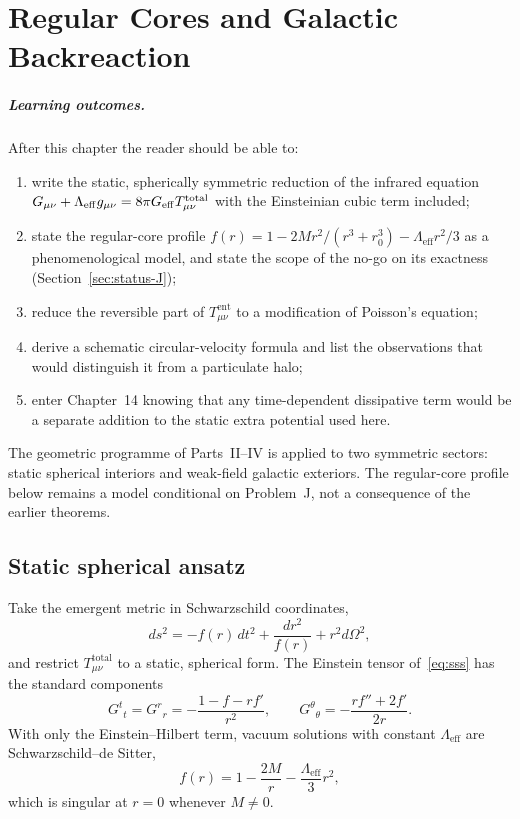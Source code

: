 \chapter[Cores and galaxies]{Regular Cores and Galactic Backreaction}
\label{ch:cores-galaxies}

\paragraph{Learning outcomes.}
After this chapter the reader should be able to:
\begin{enumerate}
  \item write the static, spherically symmetric reduction of the
        infrared equation
        \(G_{\mu\nu}+\Lambda_{\mathrm{eff}}g_{\mu\nu}
        =8\pi G_{\mathrm{eff}} T_{\mu\nu}^{\mathrm{total}}\)
        with the Einsteinian cubic term included;
  \item state the regular-core profile
        \(f(r)=1-2Mr^2/(r^3+r_0^3)-\Lambda_{\mathrm{eff}}r^2/3\)
        as a phenomenological model, and state the scope of the
        no-go on its exactness (Section~\ref{sec:status-J});
  \item reduce the reversible part of \(T_{\mu\nu}^{\mathrm{ent}}\)
        to a modification of Poisson's equation;
  \item derive a schematic circular-velocity formula and list the
        observations that would distinguish it from a particulate
        halo;
  \item enter Chapter~14 knowing that any time-dependent dissipative
        term would be a separate addition to the static extra
        potential used here.
\end{enumerate}

The geometric programme of Parts~II--IV is applied to two symmetric
sectors: static spherical interiors and weak-field galactic
exteriors. The regular-core profile below remains a model conditional
on Problem~J, not a consequence of the earlier theorems.

\section{Static spherical ansatz}
\label{sec:ch13-ansatz}

Take the emergent metric in Schwarzschild coordinates,
\begin{equation}
  \label{eq:sss}
  ds^2
  =-f(r)\,dt^2
   +\frac{dr^2}{f(r)}
   +r^2 d\Omega^2,
\end{equation}
and restrict \(T_{\mu\nu}^{\mathrm{total}}\) to a static, spherical
form. The Einstein tensor of~\eqref{eq:sss} has the standard
components
\begin{equation}
  \label{eq:G-sss}
  G^t{}_t=G^r{}_r
  =-\frac{1-f-rf'}{r^2},
  \qquad
  G^\theta{}_\theta
  =-\frac{rf''+2f'}{2r}.
\end{equation}
With only the Einstein--Hilbert term, vacuum solutions with
constant \(\Lambda_{\mathrm{eff}}\) are Schwarzschild--de Sitter,
\begin{equation}
  \label{eq:SdS}
  f(r)=1-\frac{2M}{r}-\frac{\Lambda_{\mathrm{eff}}}{3}r^2,
\end{equation}
which is singular at \(r=0\) whenever \(M\neq 0\).

